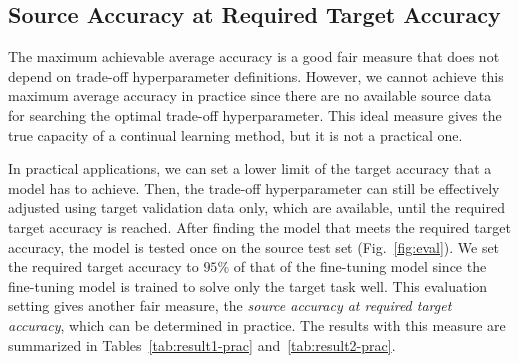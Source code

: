 \documentclass[letterpaper]{article}
\begin{document}
\subsection{Source Accuracy at Required Target Accuracy}



The maximum achievable average accuracy is a good fair measure that does not depend on trade-off hyperparameter definitions. However, we cannot achieve this maximum average accuracy in practice since there are no available source data for searching the optimal trade-off hyperparameter. This ideal measure gives the true capacity of a continual learning method, but it is not a practical one.









In practical applications, we can set a lower limit of the target accuracy that a model has to achieve. Then, the trade-off hyperparameter can still be effectively adjusted using target validation data only, which are available, until the required target accuracy is reached. After finding the model that meets the required target accuracy, the model is tested once on the source test set (Fig.~\ref{fig:eval}). We set the required target accuracy to $95\%$ of that of the fine-tuning model since the fine-tuning model is trained to solve only the target task well. This evaluation setting gives another fair measure, the \textit{source accuracy at required target accuracy}, which can be determined in practice. The results with this measure are summarized in Tables~\ref{tab:result1-prac} and~\ref{tab:result2-prac}.






\begin{table}[t]
\caption{Source accuracies at required target accuracy[\%] of each method.}
\begin{center}
\end{center}
\label{tab:result1-prac}
\end{table}
\end{document}
